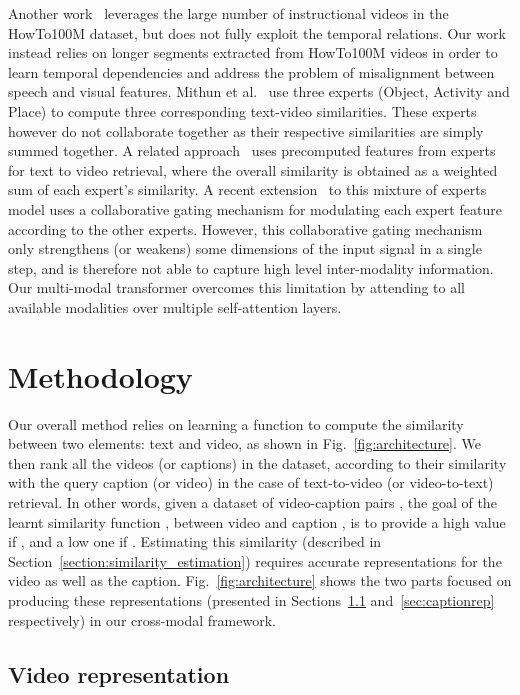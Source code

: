 \documentclass[runningheads]{llncs}
\begin{document}
Another work~\cite{miech19howto100m} leverages the large number of instructional videos in the HowTo100M dataset, but does not fully exploit the temporal relations. Our work instead relies on longer segments extracted from HowTo100M videos in order to learn temporal dependencies and address the problem of misalignment between speech and visual features.
Mithun et al.~\cite{mithun2018learning,mithun2019joint} use three experts (Object, Activity and Place) to compute three corresponding text-video similarities. These experts however do not collaborate together as their respective similarities are simply summed together. A related approach~\cite{miech2018learning} uses precomputed features from experts for text to video retrieval, where the overall similarity is obtained as a weighted sum of each expert's similarity.
A recent extension~\cite{liu2019use} to this mixture of experts model uses a collaborative gating mechanism for modulating each expert feature according to the other experts. However, this collaborative gating mechanism only strengthens (or weakens) some dimensions of the input signal in a single step, and is therefore not able to capture high level inter-modality information. Our multi-modal transformer overcomes this limitation by attending to all available modalities over multiple self-attention layers.

 



\section{Methodology}
Our overall method relies on learning a function  to compute the similarity between two elements: text and video, as shown in Fig.~\ref{fig:architecture}. We then rank all the videos (or captions) in the dataset, according to their similarity with the query caption (or video) in the case of text-to-video (or video-to-text) retrieval. In other words, given a dataset of  video-caption pairs , the goal of the learnt similarity function , between video  and caption , is to provide a high value if , and a low one if . Estimating this similarity (described in Section~\ref{section:similarity_estimation}) requires accurate representations for the video as well as the caption. Fig.~\ref{fig:architecture} shows the two parts focused on producing these representations (presented in Sections~\ref{sec:videorep} and~\ref{sec:captionrep} respectively) in our cross-modal framework.

\subsection{Video representation}
\label{sec:videorep}
\end{document}
